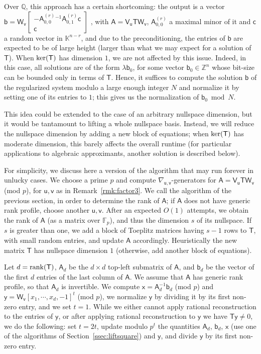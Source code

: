 \documentclass[sigconf]{acmart}
\newcommand{\vb}{\ensuremath{\mathsf{b}}}
\newcommand{\vc}{\ensuremath{\mathsf{c}}}
\newcommand{\vu}{\ensuremath{\mathsf{u}}}
\newcommand{\vv}{\ensuremath{\mathsf{v}}}
\newcommand{\vx}{\ensuremath{\mathsf{x}}}
\newcommand{\vy}{\ensuremath{\mathsf{y}}}
\newcommand{\mA}{\ensuremath{\mathsf{A}}}
\newcommand{\mT}{\ensuremath{\mathsf{T}}}
\newcommand{\mV}{\ensuremath{\mathsf{V}}}
\newcommand{\mW}{\ensuremath{\mathsf{W}}}
\newcommand{\K}{\ensuremath{\mathbb{K}}}
\newcommand{\Q}{\ensuremath{\mathbb{Q}}}
\newcommand{\Z}{\ensuremath{\mathbb{Z}}}
\theoremstyle{acmdefinition}
\begin{document}
Over $\Q$, this approach has a certain shortcoming: the output is a
vector
%
$\vb=\mW_{\vv}
\left[\begin{smallmatrix} 
-\mA^{(r)}_{0,0}{}^{-1} \mA^{(r)}_{0,1} \vc \\ 
\vc
\end{smallmatrix}\right]$
%
, with $\mA=\mV_\vu \mT \mW_{\vv}$, $\mA^{(r)}_{0,0}$ a maximal minor
of it and $\vc$ a random vector in $\K^{n-r}$, and due to the
preconditioning, the entries of $\vb$ are expected to be of large
height (larger than what we may expect for a solution of $\mT$). When
${\rm ker}(\mT)$ has dimension $1$, we are not affected by this
issue. Indeed, in this case, all solutions are of the form
$\lambda \vb_0$, for some vector $\vb_0 \in \Z^n$ whose bit-size can
be bounded only in terms of $\mT$. Hence, it suffices to compute the
solution $\vb$ of the regularized system modulo a large enough integer
$N$ and normalize it by setting one of its entries to $1$; this gives
us the normalization of $\vb_0 \bmod N$.

This idea could be extended to the case of an arbitrary nullspace
dimension, but it would be tantamount to lifting a whole nullspace
basis. Instead, we will reduce the nullspace dimension by adding a new
block of equations; when ${\rm ker}(\mT)$ has moderate dimension, this
barely affects the overall runtime (for particular applications to
algebraic approximants, another solution is described below).

For simplicity, we discuss here a version of the algorithm that may
run forever in unlucky cases. We choose a prime $p$ and compute
$\nabla_{\vu,\vv}$-generators for $\mA = \mV_\vu \mT \mW_{\vv}$ (mod
$p$), for $\vu,\vv$ as in Remark~\ref{rmk:factor3}. We call the
algorithm of the previous section, in order to determine the rank of
$\mA$; if $\mA$ does not have generic rank profile, choose another
$\vu,\vv$. After an expected $O(1)$ attempts, we obtain the rank of
$\mA$ (as a matrix over $\mathbb{F}_p$), and thus the dimension $s$ of
its nullspace. If $s$ is greater than one, we add a block of Toeplitz
matrices having $s-1$ rows to $\mT$, with small random entries, and
update $\mA$ accordingly. Heuristically the new matrix $\mT$ has
nullspace dimension $1$ (otherwise, add another block of equations).

Let $d={\rm rank}(\mT)$, $\mA_{d}$ be the $d \times d$ top-left
submatrix of $\mA$, and $\vb_d$ be the vector of the first $d$ entries
of the last column of $\mA$. We assume that $\mA$ has generic rank
profile, so that $\mA_{d}$ is invertible.  We compute
$\vx = \mA_d^{-1} \vb_d$ (mod $p$) and
$\vy = \mW_\vv [x_1, \cdots, x_d, -1]^t$ (mod $p$), we normalize $\vy$
by dividing it by its first non-zero entry, and we set $t=1$.  While
we either cannot apply rational reconstruction to the entries of
$\vy$, or after applying rational reconstruction to $\vy$ we have
$\mT \vy \ne 0$, we do the following: set $t = 2t$, update modulo
$p^t$ the quantities $\mA_{d}$, $\vb_d$, $\vx$ (use one of the
algorithms of Section~\ref{ssec:liftsquare}) and $\vy$, and divide
$\vy$ by its first non-zero entry.
\end{document}
